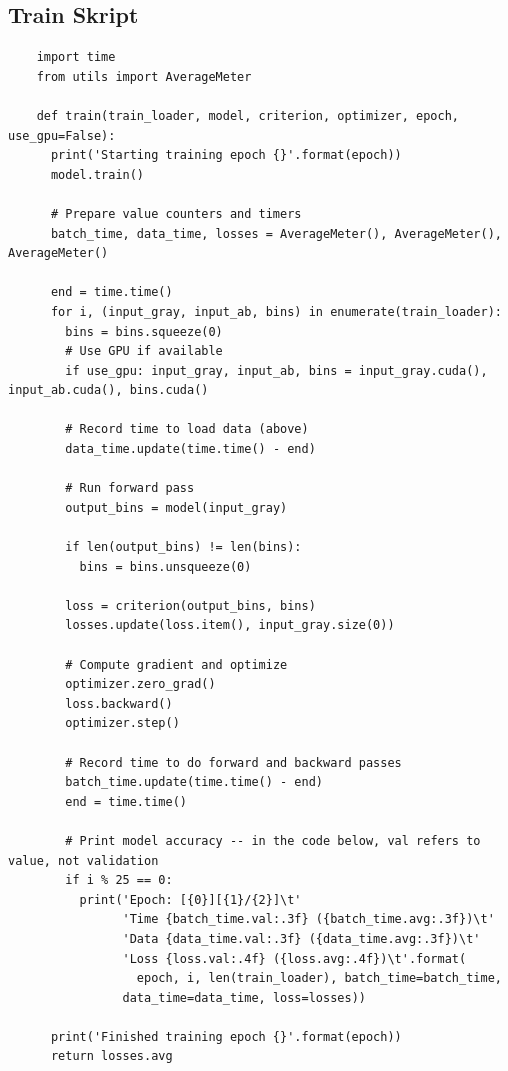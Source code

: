 \subsection{Train Skript}
\begin{longlisting}
  \begin{verbatim}
    import time
    from utils import AverageMeter

    def train(train_loader, model, criterion, optimizer, epoch, use_gpu=False):
      print('Starting training epoch {}'.format(epoch))
      model.train()

      # Prepare value counters and timers
      batch_time, data_time, losses = AverageMeter(), AverageMeter(), AverageMeter()

      end = time.time()
      for i, (input_gray, input_ab, bins) in enumerate(train_loader):
        bins = bins.squeeze(0)
        # Use GPU if available
        if use_gpu: input_gray, input_ab, bins = input_gray.cuda(), input_ab.cuda(), bins.cuda()

        # Record time to load data (above)
        data_time.update(time.time() - end)

        # Run forward pass
        output_bins = model(input_gray)

        if len(output_bins) != len(bins):
          bins = bins.unsqueeze(0)
        
        loss = criterion(output_bins, bins)
        losses.update(loss.item(), input_gray.size(0))

        # Compute gradient and optimize
        optimizer.zero_grad()
        loss.backward()
        optimizer.step()

        # Record time to do forward and backward passes
        batch_time.update(time.time() - end)
        end = time.time()

        # Print model accuracy -- in the code below, val refers to value, not validation
        if i % 25 == 0:
          print('Epoch: [{0}][{1}/{2}]\t'
                'Time {batch_time.val:.3f} ({batch_time.avg:.3f})\t'
                'Data {data_time.val:.3f} ({data_time.avg:.3f})\t'
                'Loss {loss.val:.4f} ({loss.avg:.4f})\t'.format(
                  epoch, i, len(train_loader), batch_time=batch_time,
                data_time=data_time, loss=losses)) 

      print('Finished training epoch {}'.format(epoch))
      return losses.avg
  \end{verbatim}
\end{longlisting}

